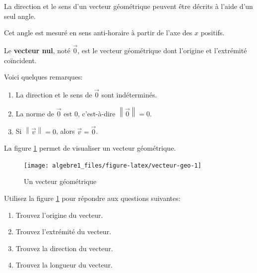 \documentclass[]{book}
\providecommand{\tightlist}{%
  \setlength{\itemsep}{0pt}\setlength{\parskip}{0pt}}
\theoremstyle{definition}
\theoremstyle{definition}
\theoremstyle{definition}
\theoremstyle{remark}
\let\BeginKnitrBlock\begin \let\EndKnitrBlock\end
\begin{document}
\BeginKnitrBlock{remark}
{}La direction et le sens d'un vecteur géométrique peuvent être décrits à l'aide d'un seul angle.

Cet angle est mesuré en sens anti-horaire à partir de l'axe des \(x\) positifs.
\EndKnitrBlock{remark}

\BeginKnitrBlock{definition}[Le vecteur nul]
\protect\hypertarget{def:unnamed-chunk-129}{}{\label{def:unnamed-chunk-129} {} }Le \textbf{vecteur nul}, noté \(\overrightarrow{0}\), est le vecteur géométrique dont l'origine et l'extrémité coïncident.
\EndKnitrBlock{definition}

\BeginKnitrBlock{remark}
{}Voici quelques remarques:

\begin{enumerate}
\def\labelenumi{\arabic{enumi}.}
\tightlist
\item
  La direction et le sens de \(\overrightarrow{0}\) sont indéterminés.
\item
  La norme de \(\overrightarrow{0}\) est \(0\), c'est-à-dire \(\left\lVert \overrightarrow{0} \right\rVert=0\).
\item
  Si \(\left\lVert \overrightarrow{v} \right\rVert=0\), alors \(\overrightarrow{v}=\overrightarrow{0}\).
\end{enumerate}
\EndKnitrBlock{remark}

La figure \ref{fig:vecteur-geo} permet de visualiser un vecteur géométrique.

\begin{figure}

{\centering \texttt{[image: algebre1\_files/figure-latex/vecteur-geo-1]} 

}

\caption{Un vecteur géométrique}\label{fig:vecteur-geo}
\end{figure}

\BeginKnitrBlock{example}
\protect\hypertarget{exm:unnamed-chunk-131}{}{\label{exm:unnamed-chunk-131} }Utilisez la figure \ref{fig:vecteur-geo} pour répondre aux questions suivantes:

\begin{enumerate}
\def\labelenumi{\alph{enumi}.}
\tightlist
\item
  Trouvez l'origine du vecteur.
\item
  Trouvez l'extrémité du vecteur.
\item
  Trouvez la direction du vecteur.
\item
  Trouvez la longueur du vecteur.
\end{enumerate}
\EndKnitrBlock{example}
\end{document}
